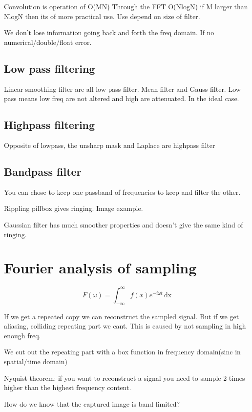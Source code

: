 Convolution is operation of O(MN) Through the FFT O(NlogN) if M larger than NlogN then its of more practical use. Use depend on size of filter. 

We don't lose information going back and forth the freq domain. If no numerical/double/float error. 

\subsection*{Low pass filtering}
Linear smoothing filter are all low pass filter. Mean filter and Gauss filter. Low pass means low freq are not altered and high are attenuated. In the ideal case. 

\subsection*{Highpass filtering}
Opposite of lowpass, the unsharp mask and Laplace are highpass filter

\subsection*{Bandpass filter}
You can chose to keep one passband of frequencies to keep and filter the other.

Rippling pillbox gives ringing. Image example.

Gaussian filter has much smoother properties and doesn't give the same kind of ringing. 

\section{Fourier analysis of sampling}
\begin{equation}
F(\omega) = \int_{-\infty}^{\infty} f(x) e^{-i\omega t}\,\text{dx}
\end{equation} %

If we get a repeated copy we can reconstruct the sampled  signal. But if we get aliasing, colliding repeating part we cant. This is caused by not sampling in high enough freq. 

We cut out the repeating part with a box function in frequency domain(sinc in spatial/time domain) 

Nyquist theorem:  if you want to reconstruct a signal you need to sample 2 times higher than the highest frequency content. 

How do we know that the captured image is band limited?




